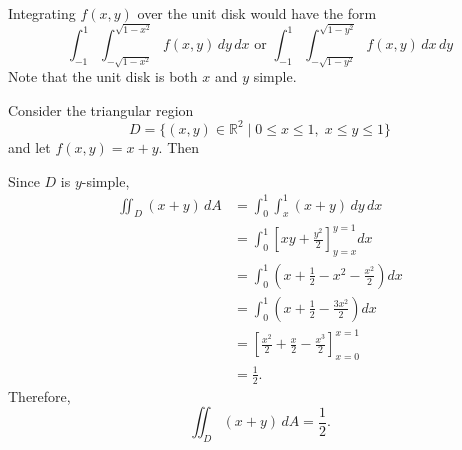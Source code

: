 	\begin{example}
		Integrating $f(x, y)$ over the unit disk would have the form
		\begin{equation}
			\int_{-1}^1 \int_{-\sqrt{1-x^2}}^{\sqrt{1-x^2}} f(x,y) \, dy\, dx \text{ or } \int_{-1}^1 \int_{-\sqrt{1-y^2}}^{\sqrt{1-y^2}} f(x,y) \, dx\, dy 
		\end{equation}
		Note that the unit disk is both $x$ and $y$ simple. 
  \end{example}

  \begin{example}
    Consider the triangular region
    \[D = \{(x,y) \in \mathbb{R}^2 \mid 0 \leq x \leq 1,\; x \leq y \leq 1\}\]
    and let $f(x,y) = x+y$. Then 
    \begin{center}
    \end{center}
    Since $D$ is $y$-simple,
    \begin{align*}
      \iint_D (x+y)\,dA
      &= \int_0^1 \int_x^1 (x+y)\,dy\,dx \\
      &= \int_0^1 \left[ xy + \frac{y^2}{2} \right]_{y=x}^{y=1} dx \\
      &= \int_0^1 \left( x+\frac{1}{2} - x^2 - \frac{x^2}{2} \right) dx \\
      &= \int_0^1 \left( x+\frac{1}{2} - \frac{3x^2}{2} \right) dx \\
      &= \left[ \frac{x^2}{2} + \frac{x}{2} - \frac{x^3}{2} \right]_{x=0}^{x=1} \\
      &= \frac{1}{2}.
    \end{align*}
    Therefore,
    \[\iint_D (x+y)\,dA = \frac{1}{2}.\]
  \end{example}

